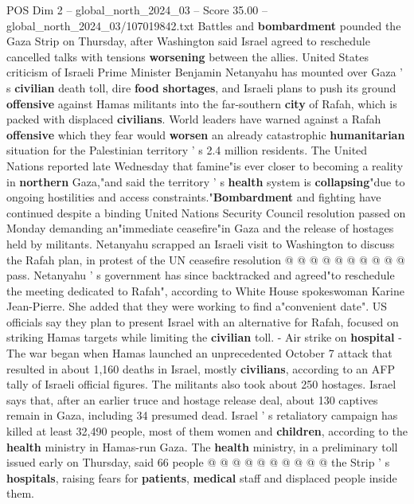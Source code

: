 \begin{textsample}{POS Dim 2 – global\_north\_2024\_03 – Score 35.00 – global\_north\_2024\_03/107019842.txt}  \label{ex:f2_pos_102}
Battles and \textbf{bombardment} pounded the Gaza Strip on Thursday, after Washington said Israel agreed to reschedule cancelled talks with tensions \textbf{worsening} between the allies.
United States criticism of Israeli Prime Minister Benjamin Netanyahu has mounted over Gaza ' s \textbf{civilian} death toll, dire \textbf{food} \textbf{shortages}, and Israeli plans to push its ground \textbf{offensive} against Hamas militants into the far-southern \textbf{city} of Rafah, which is packed with displaced \textbf{civilians}.
World leaders have warned against a Rafah \textbf{offensive} which they fear would \textbf{worsen} an already catastrophic \textbf{humanitarian} situation for the Palestinian territory ' s 2.4 million residents.
The United Nations reported late Wednesday that famine"is ever closer to becoming a reality in \textbf{northern} Gaza,"and said the territory ' s \textbf{health} system is \textbf{collapsing}"due to ongoing hostilities and access constraints."\textbf{Bombardment} and fighting have continued despite a binding United Nations Security Council resolution passed on Monday demanding an"immediate ceasefire"in Gaza and the release of hostages held by militants.
Netanyahu scrapped an Israeli visit to Washington to discuss the Rafah plan, in protest of the UN ceasefire resolution @ @ @ @ @ @ @ @ @ @ pass.
Netanyahu ' s government has since backtracked and agreed"to reschedule the meeting dedicated to Rafah", according to White House spokeswoman Karine Jean-Pierre.
She added that they were working to find a"convenient date".
US officials say they plan to present Israel with an alternative for Rafah, focused on striking Hamas targets while limiting the \textbf{civilian} toll. - Air strike on \textbf{hospital} - The war began when Hamas launched an unprecedented October 7 attack that resulted in about 1,160 deaths in Israel, mostly \textbf{civilians}, according to an AFP tally of Israeli official figures.
The militants also took about 250 hostages.
Israel says that, after an earlier truce and hostage release deal, about 130 captives remain in Gaza, including 34 presumed dead.
Israel ' s retaliatory campaign has killed at least 32,490 people, most of them women and \textbf{children}, according to the \textbf{health} ministry in Hamas-run Gaza.
The \textbf{health} ministry, in a preliminary toll issued early on Thursday, said 66 people @ @ @ @ @ @ @ @ @ @ the Strip ' s \textbf{hospitals}, raising fears for \textbf{patients}, \textbf{medical} staff and displaced people inside them.

\end{textsample}
